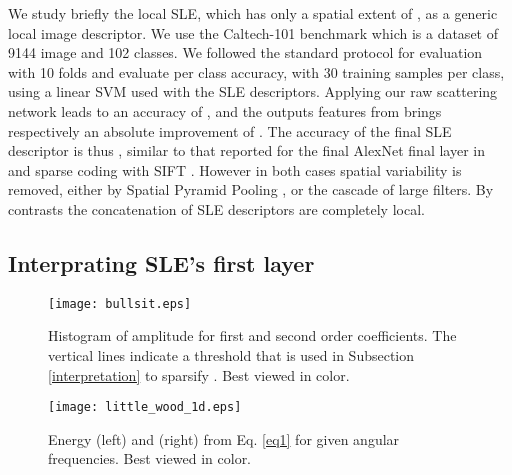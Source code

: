 \documentclass[10pt,twocolumn,letterpaper]{article}
\begin{document}
We study briefly the local SLE, which has only a spatial extent of , as a generic local image descriptor. We use the Caltech-101 benchmark which is a dataset of 9144 image and 102 classes. We followed the standard protocol for evaluation \cite{boureau2011ask} with 10 folds and evaluate per class accuracy, with 30 training samples per class, using a linear SVM used with the SLE descriptors. Applying our raw scattering network leads to an accuracy of , and the outputs features from  brings respectively an absolute improvement of . The accuracy of the final SLE descriptor is thus  , similar to that reported for the final AlexNet final layer in \cite{zeiler2014visualizing} and sparse coding with SIFT \cite{boureau2011ask}. However in both cases spatial variability is removed, either by Spatial Pyramid Pooling \cite{lazebnik2006beyond}, or the cascade of large filters. By contrasts  the concatenation of SLE descriptors are completely local.









 \subsection{Interprating SLE's first layer}
\label{sec:sle_first_sec}
\label{interpretation}




\begin{figure}
\begin{center}
\texttt{[image: bullsit.eps]} 
\end{center}
   \caption{Histogram of   amplitude for first and second order coefficients. The vertical lines indicate a threshold that is used in Subsection \ref{interpretation} to sparsify . Best viewed in color.}
\label{fig:histo}
\end{figure}


\begin{figure}
\begin{center}
\texttt{[image: little\_wood\_1d.eps]} 
\end{center}
   \caption{Energy   (left)  and  (right) from Eq. \ref{eq1} for given angular frequencies. Best viewed in color.}
\label{fig:littlehood1}
\end{figure}
\end{document}
